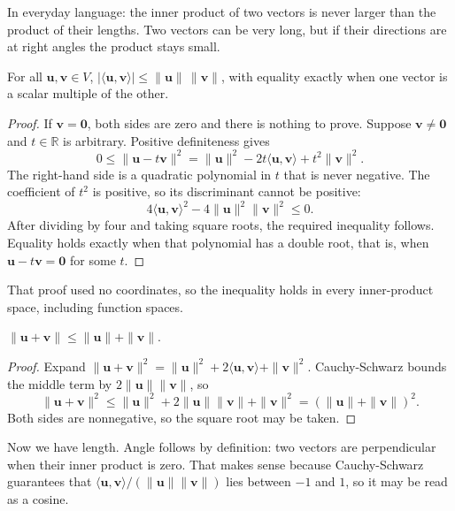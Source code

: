 In everyday language: the inner product of two vectors is never larger than the
product of their lengths. Two vectors can be very long, but if their directions are at right
angles the product stays small.

\begin{teorema}
For all $\mathbf{u},\mathbf{v}\in V$,
$|\langle\mathbf{u},\mathbf{v}\rangle|\le\|\mathbf{u}\|\,\|\mathbf{v}\|$, with
equality exactly when one vector is a scalar multiple of the other.
\end{teorema}

\begin{proof}
If $\mathbf{v}=\mathbf{0}$, both sides are zero and there is nothing to prove.
Suppose $\mathbf{v}\ne\mathbf{0}$ and $t\in\mathbb{R}$ is arbitrary. Positive definiteness
gives
\[
  0\le\|\mathbf{u}-t\mathbf{v}\|^{2}
   =\|\mathbf{u}\|^{2}-2t\langle\mathbf{u},\mathbf{v}\rangle+t^{2}\|\mathbf{v}\|^{2}.
\]
The right-hand side is a quadratic polynomial in $t$ that is never negative. The coefficient of
$t^{2}$ is positive, so its discriminant cannot be positive:
\[
  4\langle\mathbf{u},\mathbf{v}\rangle^{2}-4\|\mathbf{u}\|^{2}\|\mathbf{v}\|^{2}\le0 .
\]
After dividing by four and taking square roots, the required inequality follows. Equality
holds exactly when that polynomial has a double root, that is, when
$\mathbf{u}-t\mathbf{v}=\mathbf{0}$ for some $t$.
\end{proof}

That proof used no coordinates, so the inequality holds in every inner-product
space, including function spaces.

\begin{akibat}
$\|\mathbf{u}+\mathbf{v}\|\le\|\mathbf{u}\|+\|\mathbf{v}\|$.
\end{akibat}

\begin{proof}
Expand $\|\mathbf{u}+\mathbf{v}\|^{2}
=\|\mathbf{u}\|^{2}+2\langle\mathbf{u},\mathbf{v}\rangle+\|\mathbf{v}\|^{2}$.
Cauchy-Schwarz bounds the middle term by $2\|\mathbf{u}\|\|\mathbf{v}\|$, so
\[
  \|\mathbf{u}+\mathbf{v}\|^{2}\le\|\mathbf{u}\|^{2}+2\|\mathbf{u}\|\|\mathbf{v}\|
  +\|\mathbf{v}\|^{2}=(\|\mathbf{u}\|+\|\mathbf{v}\|)^{2}.
\]
Both sides are nonnegative, so the square root may be taken.
\end{proof}

Now we have length. Angle follows by definition: two vectors are perpendicular when their
inner product is zero. That makes sense because Cauchy-Schwarz guarantees that
$\langle\mathbf{u},\mathbf{v}\rangle/(\|\mathbf{u}\|\|\mathbf{v}\|)$ lies between $-1$
and $1$, so it may be read as a cosine.

